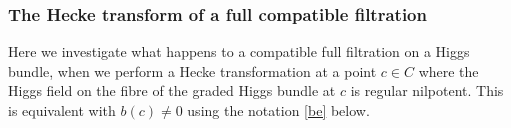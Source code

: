 

\subsubsection{The Hecke transform of a full compatible filtration}

Here we investigate what happens to a compatible full filtration on a Higgs bundle,  when we perform a Hecke transformation at a point $c\in C$ where the Higgs field on the fibre of the graded Higgs bundle at $c$ is regular nilpotent. This is equivalent with $b(c)\neq 0$ using the notation \eqref{be} below.


